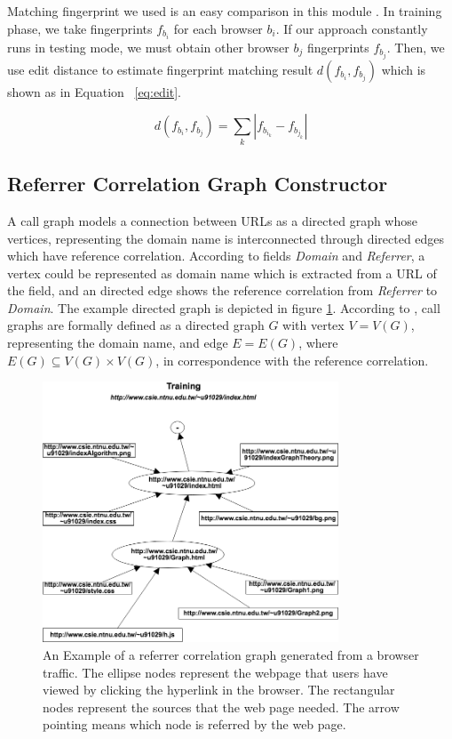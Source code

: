 Matching fingerprint we used is an easy comparison in this module \cite{bortolameotti2017decanter}. In training phase, we take fingerprints $f_{b_{i}}$ for each browser $b_{i}$. If our approach constantly runs in testing mode, we must obtain other browser $b_{j}$ fingerprints $f_{b_{j}}$. Then, we use edit distance to estimate fingerprint matching result $d(f_{b_{i}}, f_{b_{j}}) $ which is shown as in Equation ~\ref{eq:edit}.

\begin{equation}
        \label{eq:edit}
        d(f_{b_{i}}, f_{b_{j}}) = \sum_k \left |  f_{b_{i_{k}}} - f_{b_{j_{k}}} \right |  
\end{equation}

\subsection{Referrer Correlation Graph Constructor}

A call graph models a connection between URLs as a directed graph whose vertices, representing the domain name is interconnected through directed edges which have reference correlation. According to fields {\em Domain} and {\em Referrer}, a vertex could be represented as domain name which is extracted from a URL of the field, and an directed edge shows the reference correlation from {\em Referrer} to {\em Domain}. The example directed graph is depicted in figure \ref{fig:ref_graph}. According to \cite{kinable2011malware}, call graphs are formally defined as a directed graph $G$ with vertex $V = V(G)$, representing the domain name, and edge $E = E(G)$, where $E(G) \subseteq V(G) \times V(G) $, in correspondence with the reference correlation.

\begin{figure}[!t]
\centering
\includegraphics[width=250pt]{image/ref_graph.png}
\caption{An Example of a referrer correlation graph generated from a browser traffic. The ellipse nodes represent the webpage that users have viewed by clicking the hyperlink in the browser. The rectangular nodes represent the sources that the web page needed. The arrow pointing means which node is referred by the web page.}
\label{fig:ref_graph}
\end{figure}

